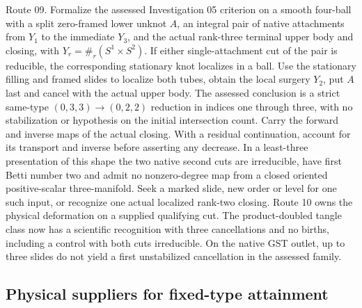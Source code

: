 \begin{openproblem}
\label{prob:ed06-marked-reduction}
Route 09. Formalize the assessed Investigation 05 criterion on a smooth
four-ball with a split zero-framed lower unknot $A$, an integral pair of
native attachments from $Y_1$ to the immediate $Y_3$, and the actual
rank-three terminal upper body and closing, with
$Y_r=\#_r(S^1\times S^2)$. If either single-attachment cut of the pair is
reducible, the corresponding stationary knot localizes in a ball.
Use the stationary filling and framed slides to localize both tubes,
obtain the local surgery $Y_2$, put $A$ last and cancel with the actual
upper body. The assessed conclusion is a strict same-type
$(0,3,3)\to(0,2,2)$ reduction in indices one through three, with no
stabilization or hypothesis on the initial intersection count. Carry
the forward and inverse maps of the actual closing. With a residual
continuation, account for its transport and inverse before asserting
any decrease. In a least-three presentation of this shape the two
native second cuts are irreducible, have first Betti number two and
admit no nonzero-degree map from a closed oriented positive-scalar
three-manifold. Seek a marked slide, new order or level for one such
input, or recognize one actual localized rank-two closing. Route 10
owns the physical deformation on a supplied qualifying cut. The product-doubled tangle class now has a scientific recognition with three cancellations and no births, including a control with both cuts irreducible. On the native GST outlet, up to three slides do not yield a first unstabilized cancellation in the assessed family.
\end{openproblem}

\subsection{Physical suppliers for fixed-type attainment}

